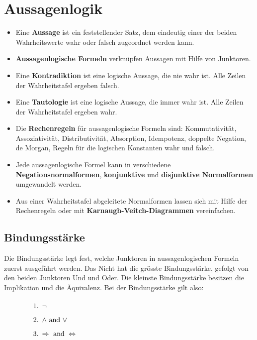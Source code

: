 \documentclass[../Main.tex]{subfiles}
\begin{document}
\section{Aussagenlogik}
\begin{itemize}
    \item Eine \textbf{Aussage} ist ein feststellender Satz, dem eindeutig einer der beiden Wahrheitswerte wahr oder falsch zugeordnet werden kann.
    \item \textbf{Aussagenlogische Formeln} verknüpfen Aussagen mit Hilfe von Junktoren.
    \item Eine \textbf{Kontradiktion} ist eine logische Aussage, die nie wahr ist. Alle Zeilen der Wahrheitstafel ergeben falsch.
    \item Eine \textbf{Tautologie} ist eine logische Aussage, die immer wahr ist. Alle Zeilen der Wahrheitstafel ergeben wahr.
    \item Die \textbf{Rechenregeln} für aussagenlogische Formeln sind: Kommutativität, Assoziativität, Distributivität, Absorption, Idempotenz, doppelte Negation, de Morgan, Regeln für die logischen Konstanten wahr und falsch.
    \item Jede aussagenlogische Formel kann in verschiedene \textbf{Negationsnormalformen}, \textbf{konjunktive} und \textbf{disjunktive Normalformen} umgewandelt werden.
    \item Aus einer Wahrheitstafel abgeleitete Normalformen lassen sich mit Hilfe der Rechenregeln oder mit \textbf{Karnaugh-Veitch-Diagrammen} vereinfachen.
\end{itemize}
\subsection{Bindungsstärke}
Die Bindungsstärke legt fest, welche Junktoren in 
aussagenlogischen Formeln zuerst ausgeführt werden. Das Nicht hat die grösste 
Bindungsstärke, gefolgt von den beiden Junktoren Und und Oder. Die kleinste 
Bindungsstärke besitzen die Implikation und die Äquivalenz.
Bei der Bindungsstärke gilt also:
\begin{equation}
    \parbox{30em}{
        \begin{enumerate}
            \item \( \neg \)
            \item \( \land \text{ and } \lor \)
            \item \( \Rightarrow \text{ and } \Leftrightarrow \)
        \end{enumerate}}
\end{equation}
\end{document}
